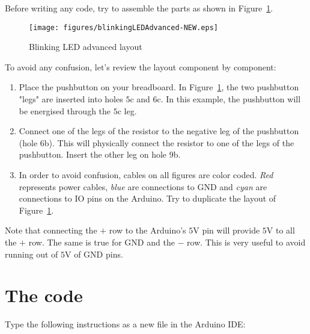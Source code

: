 Before writing any code, try to assemble the parts as shown in Figure~\ref{fig:blinkingLEDAdvancedLayout}.

\begin{figure}[htbp]
  \centering
  \texttt{[image: figures/blinkingLEDAdvanced-NEW.eps]}
  \caption{Blinking LED advanced layout
  \label{fig:blinkingLEDAdvancedLayout}}
\end{figure}

To avoid any confusion, let's review the layout component by component:

\begin{enumerate}
	\item Place the pushbutton on your breadboard. In Figure~\ref{fig:blinkingLEDAdvancedLayout}, the two pushbutton "legs" are inserted into holes $5$c and $6$c. In this example, the pushbutton will be energised through the $5$c leg.
	\item Connect one of the legs of the resistor to the negative leg of the pushbutton (hole $6$b). This will physically connect the resistor to one of the legs of the pushbutton. Insert the other leg on hole $9$b.
	\item In order to avoid confusion, cables on all figures are color coded. \emph{Red} represents power cables, \emph{blue} are connections to GND and \emph{cyan} are connections to IO pins on the Arduino. Try to duplicate the layout of Figure~\ref{fig:blinkingLEDAdvancedLayout}.
\end{enumerate}

Note that connecting the $+$ row to the Arduino's $5$V pin will provide $5$V to all the $+$ row. The same is true for GND and the $-$ row. This is very useful to avoid running out of $5$V of GND pins.


\section{The code}

Type the following instructions as a new file in the Arduino IDE:

